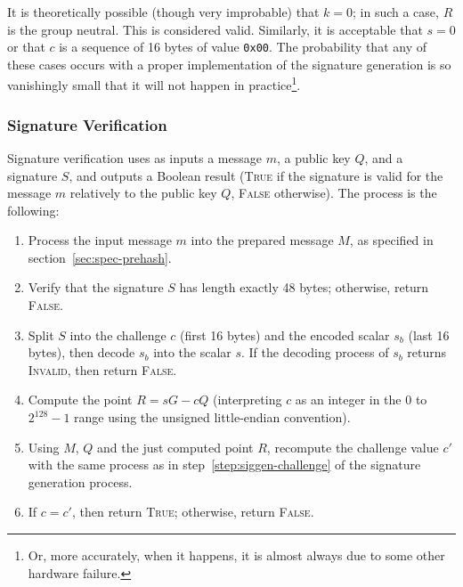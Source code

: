 \documentclass{llncs}
\begin{document}
It is theoretically possible (though very improbable) that $k = 0$; in
such a case, $R$ is the group neutral. This is considered valid.
Similarly, it is acceptable that $s = 0$ or that $c$ is a sequence of 16
bytes of value \verb+0x00+. The probability that any of these cases
occurs with a proper implementation of the signature generation is so
vanishingly small that it will not happen in practice\footnote{Or, more
accurately, when it happens, it is almost always due to some other
hardware failure.}.

\subsubsection{Signature Verification}

Signature verification uses as inputs a message $m$, a public key $Q$,
and a signature $S$, and outputs a Boolean result (\textsc{True} if the
signature is valid for the message $m$ relatively to the public key $Q$,
\textsc{False} otherwise). The process is the following:
\begin{enumerate}

    \item Process the input message $m$ into the prepared message $M$,
    as specified in section~\ref{sec:spec-prehash}.

    \item Verify that the signature $S$ has length exactly 48 bytes;
    otherwise, return \textsc{False}.

    \item Split $S$ into the challenge $c$ (first 16 bytes) and the
    encoded scalar $s_b$ (last 16 bytes), then decode $s_b$ into the
    scalar $s$. If the decoding process of $s_b$ returns
    \textsc{Invalid}, then return \textsc{False}.

    \item Compute the point $R = sG - cQ$ (interpreting $c$ as an
    integer in the $0$ to $2^{128}-1$ range using the unsigned
    little-endian convention).

    \item Using $M$, $Q$ and the just computed point $R$, recompute the
    challenge value $c'$ with the same process as in
    step~\ref{step:siggen-challenge} of the signature generation
    process.

    \item If $c = c'$, then return \textsc{True}; otherwise, return
    \textsc{False}.

\end{enumerate}
\end{document}

